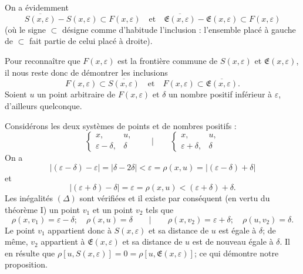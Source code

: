 \documentclass[a4paper,12pt]{amsart}
\begin{document}
On a évidemment
\[
\overline{S(x,\varepsilon)}-S(x,\varepsilon)\subset F(x,\varepsilon)
\quad\text{et}\quad
\overline{\mathfrak{E}(x,\varepsilon)}-\mathfrak{E}(x,\varepsilon)\subset F(x,\varepsilon)
\]
(où le signe $\subset$ désigne comme d'habitude l'inclusion : l'ensemble placé à gauche de $\subset$ fait partie de celui placé à droite).

Pour reconnaître que $F(x,\varepsilon)$ est la frontière commune de $S(x,\varepsilon)$ et $\mathfrak{E}(x,\varepsilon)$, il nous reste donc de démontrer les inclusions
\[
F(x,\varepsilon)\subset\overline{S(x,\varepsilon)}\quad\text{et}\quad F(x,\varepsilon)\subset\overline{\mathfrak{E}(x,\varepsilon)}.
\]
Soient $u$ un point arbitraire de $F(x,\varepsilon)$ et $\delta$ un nombre positif inférieur à $\varepsilon$, d'ailleurs quelconque.

Considérons les deux systèmes de points et de nombres positifs :
\[
\left\{\begin{array}{cc}x,&u,\\\varepsilon-\delta,&\delta\end{array}\right.
\qquad\Big|\qquad
\left\{\begin{array}{cc}x,&u,\\\varepsilon+\delta,&\delta\end{array}\right.
\]
On a
\[|(\varepsilon-\delta)-\varepsilon|=|\delta-2\delta|<\varepsilon=\rho(x,u)=|(\varepsilon-\delta)+\delta|\]
et
\[|(\varepsilon+\delta)-\delta|=\varepsilon=\rho(x,u)<(\varepsilon+\delta)+\delta.\]
Les inégalités $(\Delta)$ sont vérifiées et il existe par conséquent (en vertu du théorème I) un point $v_1$ et un point $v_2$ tels que
\[
\rho(x,v_1)=\varepsilon-\delta;\quad\rho(x,u)=\delta
\qquad\Big|\qquad
\rho(x,v_2)=\varepsilon+\delta;\quad\rho(u,v_2)=\delta.
\]
Le point $v_1$ appartient donc à $S(x,\varepsilon)$ et sa distance de $u$ est égale à $\delta$; de même, $v_2$ appartient à $\mathfrak{E}(x,\varepsilon)$ et sa distance de $u$ est de nouveau égale à $\delta$. Il en résulte que $\rho[u,S(x,\varepsilon)]=0=\rho[u,\mathfrak{E}(x,\varepsilon)]$; ce qui démontre notre proposition.
\end{document}
